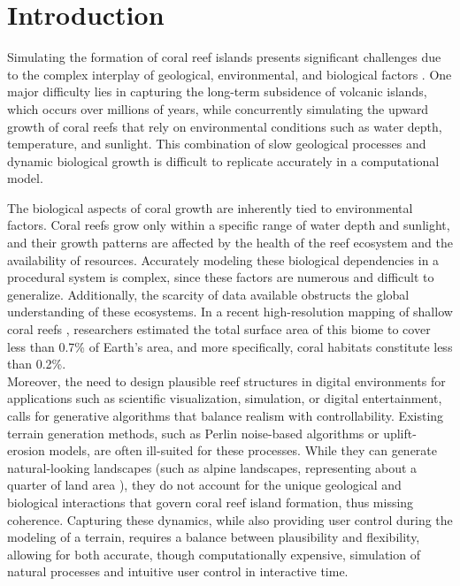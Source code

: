 \section{Introduction}

Simulating the formation of coral reef islands presents significant challenges due to the complex interplay of geological, environmental, and biological factors \cite{Hopley2014}. One major difficulty lies in capturing the long-term subsidence of volcanic islands, which occurs over millions of years, while concurrently simulating the upward growth of coral reefs that rely on environmental conditions such as water depth, temperature, and sunlight. This combination of slow geological processes and dynamic biological growth is difficult to replicate accurately in a computational model.

The biological aspects of coral growth are inherently tied to environmental factors. Coral reefs grow only within a specific range of water depth and sunlight, and their growth patterns are affected by the health of the reef ecosystem and the availability of resources. Accurately modeling these biological dependencies in a procedural system is complex, since these factors are numerous and difficult to generalize. Additionally, the scarcity of data available obstructs the global understanding of these ecosystems. In a recent high-resolution mapping of shallow coral reefs \cite{Lyons2024}, researchers estimated the total surface area of this biome to cover less than 0.7\% of Earth's area, and more specifically, coral habitats constitute less than 0.2\%.  \\
\indent Moreover, the need to design plausible reef structures in digital environments for applications such as scientific visualization, simulation, or digital entertainment, calls for generative algorithms that balance realism with controllability. Existing terrain generation methods, such as Perlin noise-based algorithms or uplift-erosion models, are often ill-suited for these processes. While they can generate natural-looking landscapes (such as alpine landscapes, representing about a quarter of land area \cite{Korner2014}), they do not account for the unique geological and biological interactions that govern coral reef island formation, thus missing coherence. Capturing these dynamics, while also providing user control during the modeling of a terrain, requires a balance between plausibility and flexibility, allowing for both accurate, though computationally expensive, simulation of natural processes and intuitive user control in interactive time.

